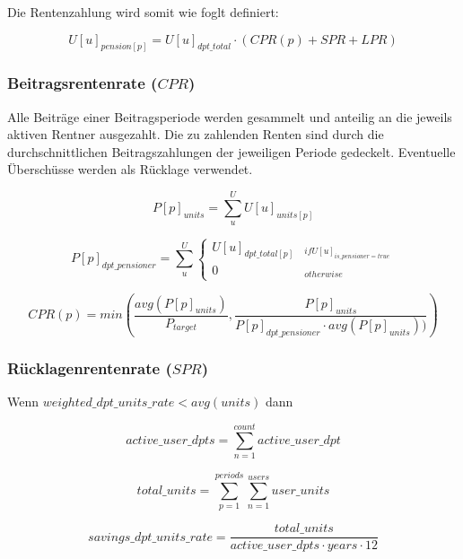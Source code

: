 Die Rentenzahlung wird somit wie foglt definiert:

\begin{equation}
U[u]_{pension[p]} = U[u]_{dpt\_total} \cdot (CPR(p) + SPR + LPR)
\end{equation}

\subsubsection*{Beitragsrentenrate ($CPR$)}
Alle Beiträge einer Beitragsperiode werden gesammelt und anteilig an die jeweils
aktiven Rentner ausgezahlt.
Die zu zahlenden Renten sind durch die durchschnittlichen Beitragszahlungen der 
jeweiligen Periode gedeckelt. Eventuelle Überschüsse werden als Rücklage verwendet.

\begin{equation}
P[p]_{units} = \sum_{u}^{U} U[u]_{units[p]}
\end{equation}

\begin{equation}
P[p]_{dpt\_pensioner} = 
\sum_{u}^{U} \begin{cases} 
U[u]_{dpt\_total[p]} & _{if U[u]_{is\_pensioner = true}}\\
0 & _{otherwise}
\end{cases}
\end{equation}

\begin{equation}
CPR(p) = min(\frac{avg(P[p]_{units})}{P_{target}},\frac{P[p]_{units}} {P[p]_{dpt\_pensioner} \cdot avg(P[p]_{units}))})
\end{equation}


\subsubsection*{Rücklagenrentenrate ($SPR$)}

Wenn $weighted\_dpt\_units\_rate < avg(units)$ dann 

\begin{equation}
	active\_user\_dpts = 
	\sum_{n=1}^{count} active\_user\_dpt
\end{equation}

\begin{equation}
	total\_units = 	
	\sum_{p=1}^{periods} \sum_{n=1}^{users} user\_units	
\end{equation}

\begin{equation}
	savings\_dpt\_units\_rate = 	
	\frac{total\_units} 
	{active\_user\_dpts \cdot years \cdot 12}		
\end{equation}


